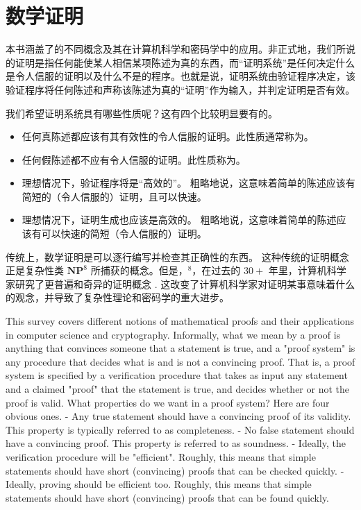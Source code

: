 \section{数学证明}
本书涵盖了的不同概念及其在计算机科学和密码学中的应用。非正式地，我们所说的证明是指任何能使某人相信某项陈述为真的东西，而“证明系统”是任何决定什么是令人信服的证明以及什么不是的程序。也就是说，证明系统由验证程序决定，该验证程序将任何陈述和声称该陈述为真的“证明”作为输入，并判定证明是否有效。

我们希望证明系统具有哪些性质呢？这有四个比较明显要有的。
\begin{itemize}
    \item 任何真陈述都应该有其有效性的令人信服的证明。此性质通常称为。
    \item 任何假陈述都不应有令人信服的证明。此性质称为。
    \item 理想情况下，验证程序将是“高效的”。 粗略地说，这意味着简单的陈述应该有简短的（令人信服的）证明，且可以快速。
    \item 理想情况下，证明生成也应该是高效的。 粗略地说，这意味着简单的陈述应该有可以快速的简短（令人信服的）证明。
\end{itemize}


传统上，数学证明是可以逐行编写并检查其正确性的东西。 这种传统的证明概念正是复杂性类 $\mathbf{N P}^8$ 所捕获的概念。但是，$^8$，在过去的 $30+$ 年里，计算机科学家研究了更普遍和奇异的证明概念 . 这改变了计算机科学家对证明某事意味着什么的观念，并导致了复杂性理论和密码学的重大进步。

This survey covers different notions of mathematical proofs and their applications in computer science and cryptography. Informally, what we mean by a proof is anything that convinces someone that a statement is true, and a "proof system" is any procedure that decides what is and is not a convincing proof. That is, a proof system is specified by a verification procedure that takes as input any statement and a claimed "proof" that the statement is true, and decides whether or not the proof is valid.
What properties do we want in a proof system? Here are four obvious ones.
- Any true statement should have a convincing proof of its validity. This property is typically referred to as completeness.
- No false statement should have a convincing proof. This property is referred to as soundness.
- Ideally, the verification procedure will be "efficient". Roughly, this means that simple statements should have short (convincing) proofs that can be checked quickly.
- Ideally, proving should be efficient too. Roughly, this means that simple statements should have short (convincing) proofs that can be found quickly.

